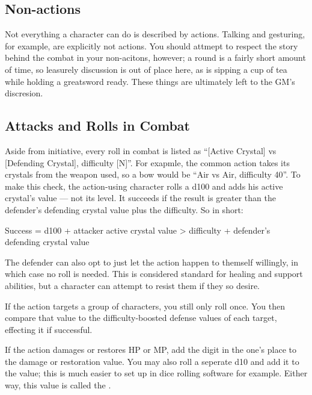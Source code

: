 \begin{multicols}{2}
    \subsection{Non-actions}
        Not everything a character can do is described by actions. Talking and gesturing, for example, are explicitly not actions. You should attmept to respect the story behind the combat in your non-acitons, however; a round is a fairly short amount of time, so leasurely discussion is out of place here, as is sipping a cup of tea while holding a greatsword ready. These things are ultimately left to the GM's discresion.

    \subsection{Attacks and Rolls in Combat}\label{subsec:attacks}
        Aside from initiative, every roll in combat is listed as ``[Active Crystal] vs [Defending Crystal], difficulty [N]''. For exapmle, the common action  takes its crystals from the weapon used, so a bow would be ``Air vs Air, difficulty 40''. To make this check, the action-using character rolls a d100 and adds his active crystal's value --- not its level. It succeeds if the result is greater than the defender's defending crystal value plus the difficulty. So in short:

        Success = d100 + attacker active crystal value > difficulty + defender's defending crystal value

        The defender can also opt to just let the action happen to themself willingly, in which case no roll is needed. This is considered standard for healing and support abilities, but a character can attempt to resist them if they so desire.

        If the action targets a group of characters, you still only roll once. You then compare that value to the difficulty-boosted defense values of each target, effecting it if successful.

        If the action damages or restores HP or MP, add the digit in the one's place to the damage or restoration value. You may also roll a seperate d10 and add it to the value; this is much easier to set up in dice rolling software for example. Either way, this value is called the .



\end{multicols}
